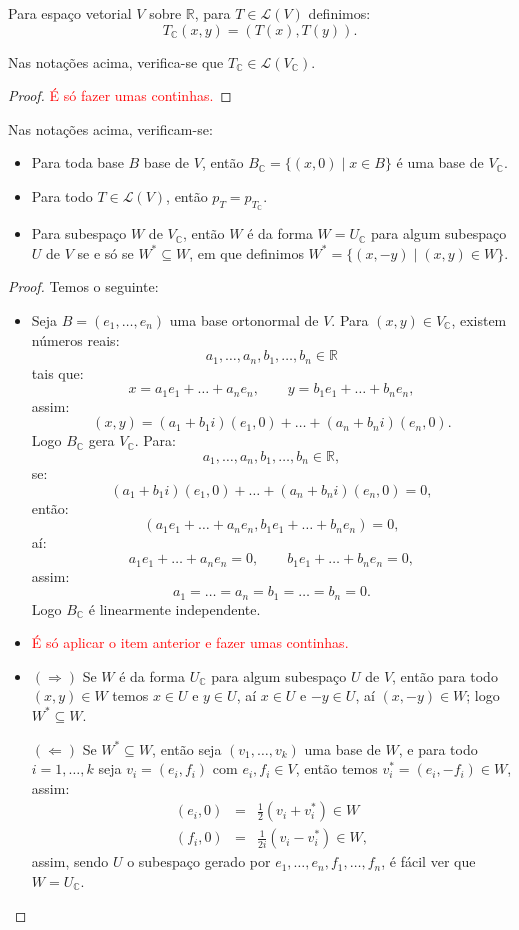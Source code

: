 \documentclass[11pt,twoside,a4paper]{book}
\begin{document}
\begin{definicao}
Para espaço vetorial $V$ sobre $\mathbb{R}$, para $T\in\mathcal{L}(V)$ definimos:
\[
T_\mathbb{C}(x,y)=(T(x),T(y)).
\]
\end{definicao}

\begin{proposicao}
Nas notações acima, verifica-se que $T_\mathbb{C}\in\mathcal{L}(V_\mathbb{C})$.
\end{proposicao}
\begin{proof}
\textcolor{red}{É só fazer umas continhas.}
\end{proof}

\begin{proposicao}
Nas notações acima, verificam-se:
\begin{itemize}
\item Para toda base $B$ base de $V$, então $B_\mathbb{C}=\{(x,0)\mid x\in B\}$ é uma base de $V_\mathbb{C}$.
\item Para todo $T\in\mathcal{L}(V)$, então $p_T=p_{T_\mathbb{C}}$.
\item Para subespaço $W$ de $V_\mathbb{C}$, então $W$ é da forma $W=U_\mathbb{C}$ para algum subespaço $U$ de $V$ se e só se $W^*\subseteq W$, em que definimos $W^*=\{(x,-y)\mid(x,y)\in W\}$.
\end{itemize}
\end{proposicao}
\begin{proof}
Temos o seguinte:
\begin{itemize}
\item Seja $B=(e_1,\dots,e_n)$ uma base ortonormal de $V$. Para $(x,y)\in V_\mathbb{C}$, existem números reais:
\[
a_1,\dots,a_n,b_1,\dots,b_n\in\mathbb{R}
\]
tais que:
\[
x=a_1e_1+\dots+a_ne_n,\quad\quad y=b_1e_1+\dots+b_ne_n,
\]
assim:
\[
(x,y)=(a_1+b_1i)(e_1,0)+\dots+(a_n+b_ni)(e_n,0).
\]
Logo $B_\mathbb{C}$ gera $V_\mathbb{C}$. Para:
\[
a_1,\dots,a_n,b_1,\dots,b_n\in\mathbb{R},
\]
se:
\[
(a_1+b_1i)(e_1,0)+\dots+(a_n+b_ni)(e_n,0)=0,
\]
então:
\[
(a_1e_1+\dots+a_ne_n,b_1e_1+\dots+b_ne_n)=0,
\]
aí:
\[
a_1e_1+\dots+a_ne_n=0,\quad\quad b_1e_1+\dots+b_ne_n=0,
\]
assim:
\[
a_1=\dots=a_n=b_1=\dots=b_n=0.
\]
Logo $B_\mathbb{C}$ é linearmente independente.
\item \textcolor{red}{É só aplicar o item anterior e fazer umas continhas.}
\item $(\Rightarrow)$ Se $W$ é da forma $U_\mathbb{C}$ para algum subespaço $U$ de $V$, então para todo $(x,y)\in W$ temos $x\in U$ e $y\in U$, aí $x\in U$ e $-y\in U$, aí $(x,-y)\in W$; logo $W^*\subseteq W$.

\medskip
\noindent
$(\Leftarrow)$ Se $W^*\subseteq W$, então seja $(v_1,\dots,v_k)$ uma base de $W$, e para todo $i=1,\dots,k$ seja $v_i=(e_i,f_i)$ com $e_i,f_i\in V$, então temos $v_i^*=(e_i,-f_i)\in W$, assim:
\[
\begin{array}{rcl}
(e_i,0)&=&\frac{1}{2}(v_i+v_i^*)\in W\\
(f_i,0)&=&\frac{1}{2i}(v_i-v_i^*)\in W,
\end{array}
\]
assim, sendo $U$ o subespaço gerado por $e_1,\dots,e_n,f_1,\dots,f_n$, é fácil ver que $W=U_\mathbb{C}$.
\end{itemize}
\end{proof}
\end{document}
